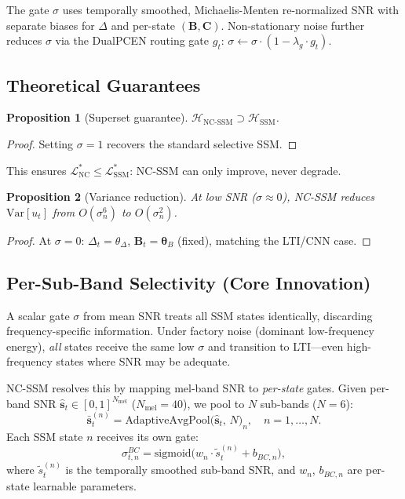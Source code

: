 \documentclass{Interspeech}
\newtheorem{proposition}{Proposition}
\begin{document}
The gate $\sigma$ uses temporally smoothed, Michaelis-Menten re-normalized SNR with separate biases for $\Delta$ and per-state $(\mathbf{B}, \mathbf{C})$.
Non-stationary noise further reduces $\sigma$ via the DualPCEN routing gate $g_t$:
$\sigma \leftarrow \sigma \cdot (1 - \lambda_g \cdot g_t)$.

\subsection{Theoretical Guarantees}
\label{sec:theory}

\begin{proposition}[Superset guarantee]
\label{prop:superset}
$\mathcal{H}_{\text{NC-SSM}} \supset \mathcal{H}_{\text{SSM}}$.
\end{proposition}
\begin{proof}
Setting $\sigma{=}1$ recovers the standard selective SSM.
\end{proof}

This ensures $\mathcal{L}^*_{\text{NC}} \leq \mathcal{L}^*_{\text{SSM}}$: NC-SSM can only improve, never degrade.

\begin{proposition}[Variance reduction]
\label{prop:var_reduction}
At low SNR ($\sigma{\approx}0$), NC-SSM reduces $\mathrm{Var}[u_t]$ from $O(\sigma_n^6)$ to $O(\sigma_n^2)$.
\end{proposition}
\begin{proof}
At $\sigma{=}0$: $\Delta_t = \theta_\Delta$, $\mathbf{B}_t = \bm{\theta}_B$ (fixed), matching the LTI/CNN case.
\end{proof}

\subsection{Per-Sub-Band Selectivity (Core Innovation)}
\label{sec:subband}

A scalar gate $\sigma$ from mean SNR treats all SSM states identically, discarding frequency-specific information.
Under factory noise (dominant low-frequency energy), \emph{all} states receive the same low $\sigma$ and transition to LTI---even high-frequency states where SNR may be adequate.

NC-SSM resolves this by mapping mel-band SNR to \emph{per-state} gates.
Given per-band SNR $\hat{\mathbf{s}}_t \in [0,1]^{N_{\text{mel}}}$ ($N_{\text{mel}}{=}40$), we pool to $N$ sub-bands ($N{=}6$):
\begin{equation}
\bar{\mathbf{s}}_t^{(n)} = \text{AdaptiveAvgPool}\big(\hat{\mathbf{s}}_t,\, N\big)_n, \quad n = 1, \ldots, N.
\label{eq:subband}
\end{equation}
Each SSM state $n$ receives its own gate:
\begin{equation}
\sigma^{BC}_{t,n} = \text{sigmoid}\big(w_n \cdot \tilde{s}^{(n)}_t + b_{BC,n}\big),
\label{eq:sigma_sub}
\end{equation}
where $\tilde{s}^{(n)}_t$ is the temporally smoothed sub-band SNR, and $w_n$, $b_{BC,n}$ are per-state learnable parameters.
\end{document}

